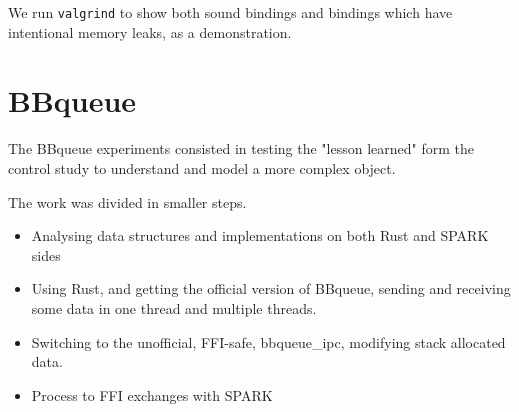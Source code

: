 \documentclass[nomenclature, english, bibtex]{kththesis}
\begin{document}
We run \texttt{valgrind} to show both sound bindings and bindings which have intentional memory leaks, as a demonstration.

\section{BBqueue}

The BBqueue experiments consisted in testing the "lesson learned" form the control study to understand and model a more complex object.

The work was divided in smaller steps.

\begin{itemize}
    \item Analysing data structures and implementations on both Rust and SPARK sides
    \item Using Rust, and getting the official version of BBqueue, sending and receiving some data in one thread and multiple threads.
    \item Switching to the unofficial, FFI-safe, bbqueue\_ipc, modifying stack allocated data. 
    \item  Process to FFI exchanges with SPARK
\end{itemize}
\end{document}
